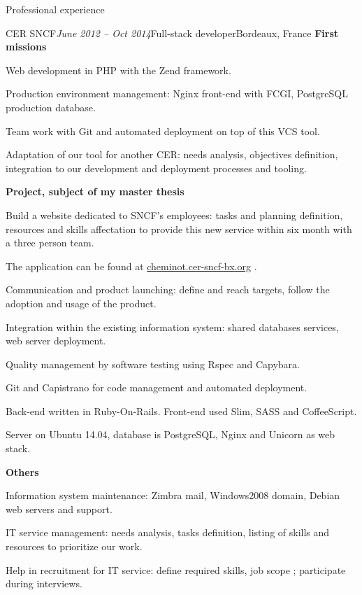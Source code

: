 \begin{rSection}{Professional experience}
\begin{rSubsection}{CER SNCF}{\em June 2012 -- Oct 2014}{Full-stack developer}{Bordeaux, France}
    \textbf{First missions}
      \item Web development in PHP with the Zend framework.
      \item Production environment management: Nginx front-end with FCGI, PostgreSQL production database.
      \item Team work with Git and automated deployment on top of this VCS tool.
      \item Adaptation of our tool for another CER: needs analysis, objectives definition, integration to our development and deployment processes and tooling.

    \textbf{Project, subject of my master thesis}
      \item Build a website dedicated to SNCF's employees: tasks and planning definition, resources and skills affectation to provide this new service within six month with a three person team.
      \item The application can be found at \href{http://cheminot.cer-sncf-bx.org}{cheminot.cer-sncf-bx.org} .
      \item Communication and product launching: define and reach targets, follow the adoption and usage of the product.
      \item Integration within the existing information system: shared databases services, web server deployment.
      \item Quality management by software testing using Rspec and Capybara.
      \item Git and Capistrano for code management and automated deployment.
      \item Back-end written in Ruby-On-Rails. Front-end used Slim, SASS and CoffeeScript.
      \item Server on Ubuntu 14.04, database is PostgreSQL, Nginx and Unicorn as web stack.

    \textbf{Others}
      \item Information system maintenance: Zimbra mail, Windows2008 domain, Debian web servers and support.
      \item IT service management: needs analysis, tasks definition, listing of skills and resources to prioritize our work.
      \item Help in recruitment for IT service: define required skills, job scope ; participate during interviews.

  \end{rSubsection}

\end{rSection}
